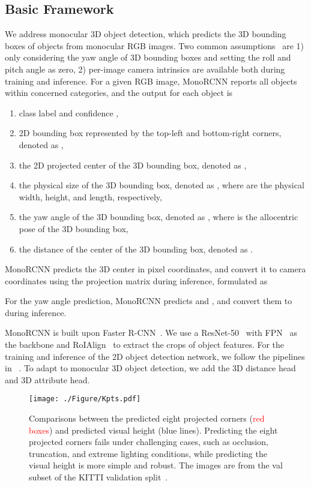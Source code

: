 \documentclass[10pt,twocolumn,letterpaper]{article}
\begin{document}
\subsection{Basic Framework}
We address monocular 3D object detection, which predicts the 3D bounding boxes of objects from monocular RGB images. Two common assumptions~\cite{DBLP:conf/cvpr/GeigerLU12} are 1) only considering the yaw angle of 3D bounding boxes and setting the roll and pitch angle as zero, 2) per-image camera intrinsics are available both during training and inference. For a given RGB image, MonoRCNN reports all objects within concerned categories, and the output for each object is
\begin{enumerate}
\item class label  and confidence ,
\item 2D bounding box represented by the top-left and bottom-right corners, denoted as ,
\item the 2D projected center of the 3D bounding box, denoted as ,
\item the physical size of the 3D bounding box, denoted as , where  are the physical width, height, and length, respectively,
\item the yaw angle of the 3D bounding box, denoted as , where  is the allocentric pose of the 3D bounding box,
\item the distance of the center of the 3D bounding box, denoted as .
\end{enumerate}

MonoRCNN predicts the 3D center  in pixel coordinates, and convert it to camera coordinates using the projection matrix  during inference, formulated as

For the yaw angle prediction, MonoRCNN predicts  and , and convert them to  during inference.

MonoRCNN is built upon Faster R-CNN~\cite{DBLP:conf/nips/RenHGS15}. We use a ResNet-50~\cite{DBLP:conf/cvpr/HeZRS16} with FPN~\cite{DBLP:conf/cvpr/LinDGHHB17} as the backbone and RoIAlign~\cite{DBLP:conf/iccv/HeGDG17} to extract the crops of object features. For the training and inference of the 2D object detection network, we follow the pipelines in ~\cite{DBLP:conf/nips/RenHGS15,DBLP:conf/iccv/HeGDG17}. To adapt to monocular 3D object detection, we add the 3D distance head and 3D attribute head.

\begin{figure}
\centering
\texttt{[image: ./Figure/Kpts.pdf]}
\caption{Comparisons between the predicted eight projected corners (\textcolor{red}{red boxes}) and predicted visual height (\textcolor[RGB]{100,149,237}{blue lines}). Predicting the eight projected corners fails under challenging cases, such as occlusion, truncation, and extreme lighting conditions, while predicting the visual height is more simple and robust. The images are from the val subset of the KITTI validation split~\cite{DBLP:conf/nips/ChenKZBMFU15}.}
\label{fig:Kpts}
\vspace{-0.4cm}
\end{figure}
\end{document}
